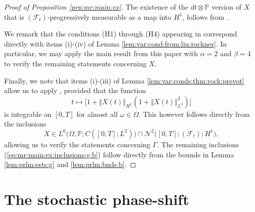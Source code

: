 \documentclass[10pt]{articleHJ}
\newcommand{\norm}[1]{\left\Vert#1\right\Vert}		%
\newcommand{\sref}[1]{(\ref{#1})}                       %
\numberwithin{equation}{section}
\begin{document}
\begin{proof}[Proof of Proposition \ref{prp:mr:main:ex}]
The existence of the $dt \otimes \mathbb{P}$
version of $X$ that
is $(\mathcal{F}_t)$-progressively
measurable as a map into $H^1$,
follows from \cite[Ex. 4.2.3]{Concise}.

We remark that the
conditions (H1) through (H4) appearing
in \cite{LiuRockner} correspond
directly with items (i)-(iv) of Lemma \ref{lem:var:cond:from:liu:rockner}.
In particular, we may apply the main result
from this paper with $\alpha = 2$ and $\beta = 4$
to verify the remaining statements concerning $X$.

Finally, we note that items (i)-(iii) of
Lemma \ref{lem:var:conds:thm:rock:prevot}
allow us to apply
\cite[Thm. 3.1.1]{Concise},
provided that the function
\begin{equation}
t \mapsto \big[ 1  + \norm{X(t)}_{H^1}(1 +  \norm{X(t)}^3_{L^2} )\big]
\end{equation}
is integrable on $[0,T]$ for almost all $\omega \in \Omega$. This however
follows directly from the inclusions
\begin{equation}
X \in L^6\big(\Omega, \mathbb{P} ; C([0,T];L^2) \big)
\cap \mathcal{N}^2\big( [0,T]; (\mathcal{F}_t); H^1 \big),
\end{equation}
allowing us to verify the statements concerning $\Gamma$.
The remaining inclusions \sref{eq:mr:main:ex:inclusions:g:b}
follow directly from
the bounds in Lemma \ref{lem:prlm:ests:g}
and \ref{lem:prlm:bnds:b}.
\end{proof}



\section{The stochastic phase-shift}
\label{sec:sps}
\end{document}
